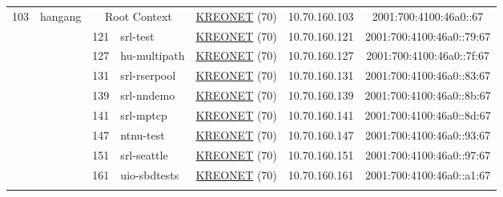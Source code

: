 \begin{small}
\begin{center}
\begin{longtable}{|c|c|c|c|c|c|c|c|}
 \multirow{11}{*}{\tiny{103}} & \multicolumn{1}{|l|}{\multirow{11}{*}{\tiny{hangang}}} & \multicolumn{2}{|c|}{\tiny{Root Context}} & \multicolumn{2}{|c|}{\tiny{\href{http://www.kreonet.net}{KREONET} (70)}} & \tiny{10.70.160.103} & \tiny{2001:700:4100:46a0::67} \\* \cline{3-3}\cline{4-4}\cline{5-5}\cline{6-6}\cline{7-7}\cline{8-8}
  &  & \tiny{121} & \multicolumn{1}{|l|}{\tiny{srl-test}} & \multicolumn{2}{|c|}{\tiny{\href{http://www.kreonet.net}{KREONET} (70)}} & \tiny{10.70.160.121} & \tiny{2001:700:4100:46a0::79:67} \\* \cline{3-3}\cline{4-4}\cline{5-5}\cline{6-6}\cline{7-7}\cline{8-8}
  &  & \tiny{127} & \multicolumn{1}{|l|}{\tiny{hu-multipath}} & \multicolumn{2}{|c|}{\tiny{\href{http://www.kreonet.net}{KREONET} (70)}} & \tiny{10.70.160.127} & \tiny{2001:700:4100:46a0::7f:67} \\* \cline{3-3}\cline{4-4}\cline{5-5}\cline{6-6}\cline{7-7}\cline{8-8}
  &  & \tiny{131} & \multicolumn{1}{|l|}{\tiny{srl-rserpool}} & \multicolumn{2}{|c|}{\tiny{\href{http://www.kreonet.net}{KREONET} (70)}} & \tiny{10.70.160.131} & \tiny{2001:700:4100:46a0::83:67} \\* \cline{3-3}\cline{4-4}\cline{5-5}\cline{6-6}\cline{7-7}\cline{8-8}
  &  & \tiny{139} & \multicolumn{1}{|l|}{\tiny{srl-nndemo}} & \multicolumn{2}{|c|}{\tiny{\href{http://www.kreonet.net}{KREONET} (70)}} & \tiny{10.70.160.139} & \tiny{2001:700:4100:46a0::8b:67} \\* \cline{3-3}\cline{4-4}\cline{5-5}\cline{6-6}\cline{7-7}\cline{8-8}
  &  & \tiny{141} & \multicolumn{1}{|l|}{\tiny{srl-mptcp}} & \multicolumn{2}{|c|}{\tiny{\href{http://www.kreonet.net}{KREONET} (70)}} & \tiny{10.70.160.141} & \tiny{2001:700:4100:46a0::8d:67} \\* \cline{3-3}\cline{4-4}\cline{5-5}\cline{6-6}\cline{7-7}\cline{8-8}
  &  & \tiny{147} & \multicolumn{1}{|l|}{\tiny{ntnu-test}} & \multicolumn{2}{|c|}{\tiny{\href{http://www.kreonet.net}{KREONET} (70)}} & \tiny{10.70.160.147} & \tiny{2001:700:4100:46a0::93:67} \\* \cline{3-3}\cline{4-4}\cline{5-5}\cline{6-6}\cline{7-7}\cline{8-8}
  &  & \tiny{151} & \multicolumn{1}{|l|}{\tiny{srl-seattle}} & \multicolumn{2}{|c|}{\tiny{\href{http://www.kreonet.net}{KREONET} (70)}} & \tiny{10.70.160.151} & \tiny{2001:700:4100:46a0::97:67} \\* \cline{3-3}\cline{4-4}\cline{5-5}\cline{6-6}\cline{7-7}\cline{8-8}
  &  & \tiny{161} & \multicolumn{1}{|l|}{\tiny{uio-sbdtests}} & \multicolumn{2}{|c|}{\tiny{\href{http://www.kreonet.net}{KREONET} (70)}} & \tiny{10.70.160.161} & \tiny{2001:700:4100:46a0::a1:67} \\* \cline{3-3}\cline{4-4}\cline{5-5}\cline{6-6}\cline{7-7}\cline{8-8}

\end{longtable}
\end{center}
\end{small}

